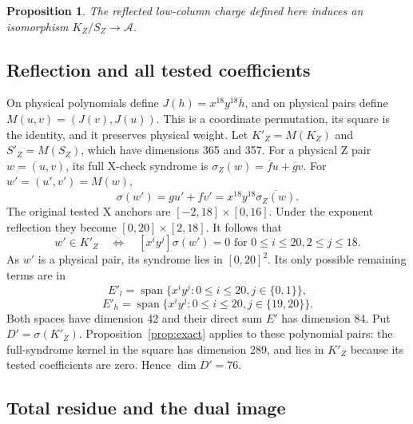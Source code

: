 \documentclass{article}
\newtheorem{proposition}{Proposition}
\DeclareMathOperator{\spn}{span}
\begin{document}
\begin{proposition}\label{prop:zcharge}
  The reflected low-column charge defined here induces an isomorphism
  \(K_Z/S_Z \to \mathcal{A}\).
\end{proposition}

\subsection{Reflection and all tested coefficients}\label{sec:z-reflection}

On physical polynomials define \(J(h) = x^{18} y^{18} \overline{h}\), and on physical pairs
define \(M(u,v) = (J(v), J(u))\). This is a coordinate permutation, its square is the identity,
and it preserves physical weight. Let \(K'_Z = M(K_Z)\) and \(S'_Z = M(S_Z)\), which have
dimensions 365 and 357. For a physical Z pair \(w = (u,v)\), its full X-check syndrome is
\(\sigma_Z(w) = \overline{f}u + \overline{g}v\). For \(w' = (u', v') = M(w)\),
\begin{equation}
  \sigma(w') = gu' + fv' = x^{18} y^{18} \overline{\sigma_Z(w)}.
\end{equation}
The original tested X anchors are \([-2,18] \times [0,16]\). Under the exponent reflection they
become \([0,20] \times [2,18]\). It follows that
\begin{equation}
  w' \in K'_Z \quad\Longleftrightarrow\quad
  [x^i y^j]\sigma(w') = 0 \text{ for } 0 \le i \le 20, 2 \le j \le 18.
\end{equation}
As \(w'\) is a physical pair, its syndrome lies in \([0,20]^2\). Its only possible remaining
terms are in
\begin{equation}
  E'_l = \spn\{x^i y^j : 0 \le i \le 20, j \in \{0,1\}\},
\end{equation}
\begin{equation}
  E'_h = \spn\{x^i y^j : 0 \le i \le 20, j \in \{19,20\}\}.
\end{equation}
Both spaces have dimension 42 and their direct sum \(E'\) has dimension 84. Put
\(D' = \sigma(K'_Z)\). Proposition~\ref{prop:exact} applies to these polynomial pairs: the
full-syndrome kernel in the square has dimension 289, and lies in \(K'_Z\) because its tested
coefficients are zero. Hence \(\dim D' = 76\).

\subsection{Total residue and the dual image}\label{sec:z-image}
\end{document}

